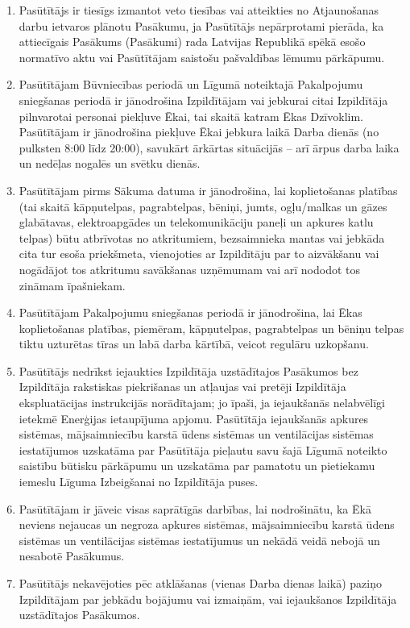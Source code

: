 \begin{multicols}{2}
\begin{enumerate}
	\item Pasūtītājs ir tiesīgs izmantot veto tiesības vai atteikties no Atjaunošanas darbu ietvaros plānotu Pasākumu, ja Pasūtītājs nepārprotami pierāda, ka attiecīgais Pasākums (Pasākumi) rada  Latvijas Republikā spēkā esošo normatīvo aktu vai Pasūtītājam saistošu pašvaldības lēmumu pārkāpumu.
	\item Pasūtītājam Būvniecības periodā un Līgumā noteiktajā Pakalpojumu sniegšanas periodā ir jānodrošina Izpildītājam vai jebkurai citai Izpildītāja pilnvarotai personai piekļuve Ēkai, tai skaitā katram Ēkas Dzīvoklim. Pasūtītājam ir jānodrošina piekļuve Ēkai jebkura laikā Darba dienās (no pulksten 8:00 līdz 20:00), savukārt ārkārtas situācijās – arī ārpus darba laika un nedēļas nogalēs un svētku dienās.
	\item Pasūtītājam pirms Sākuma datuma ir jānodrošina, lai koplietošanas platības (tai skaitā kāpņutelpas, pagrabtelpas, bēniņi, jumts, ogļu/malkas un gāzes glabātavas, elektroapgādes un telekomunikāciju paneļi un apkures katlu telpas) būtu atbrīvotas no atkritumiem, bezsaimnieka mantas vai jebkāda cita tur esoša priekšmeta, vienojoties ar Izpildītāju par to aizvākšanu vai nogādājot tos atkritumu savākšanas uzņēmumam vai arī nododot tos zināmam īpašniekam.
	\item Pasūtītājam Pakalpojumu sniegšanas periodā ir jānodrošina, lai Ēkas koplietošanas platības, piemēram, kāpņutelpas, pagrabtelpas un bēniņu telpas tiktu uzturētas tīras un labā darba kārtībā, veicot regulāru uzkopšanu.
	\item Pasūtītājs nedrīkst iejaukties Izpildītāja uzstādītajos Pasākumos bez Izpildītāja rakstiskas piekrišanas un atļaujas vai pretēji Izpildītāja ekspluatācijas instrukcijās norādītajam; jo īpaši, ja iejaukšanās nelabvēlīgi ietekmē Enerģijas ietaupījuma apjomu. Pasūtītāja iejaukšanās apkures sistēmas, mājsaimniecību karstā ūdens sistēmas un ventilācijas sistēmas iestatījumos uzskatāma par Pasūtītāja pieļautu savu šajā Līgumā noteikto saistību būtisku pārkāpumu un uzskatāma par pamatotu un pietiekamu iemeslu Līguma Izbeigšanai no Izpildītāja puses.
	\item Pasūtītājam ir jāveic visas saprātīgās darbības, lai nodrošinātu, ka Ēkā neviens nejaucas un negroza apkures sistēmas, mājsaimniecību karstā ūdens sistēmas un ventilācijas sistēmas iestatījumus un nekādā veidā nebojā un nesabotē Pasākumus.
	\item Pasūtītājs nekavējoties pēc atklāšanas (vienas Darba dienas laikā) paziņo Izpildītājam par jebkādu bojājumu vai izmaiņām, vai iejaukšanos Izpildītāja uzstādītajos Pasākumos.

\end{enumerate}
\end{multicols}
